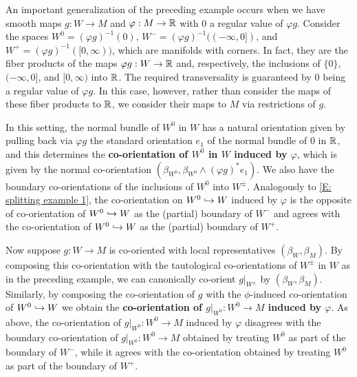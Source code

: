 \begin{example}\label{E: manifold decomposition}
An important generalization of the preceding example occurs when we have smooth maps $g:W\to M$ and $\varphi:M\to \mathbb{R}$ with $0$ a regular value of $\varphi g$. Consider the spaces $W^0=(\varphi g)^{-1}(0)$, $W^-=(\varphi g)^{-1}((-\infty,0])$, and $W^+=(\varphi g)^{-1}([0,\infty))$, which are manifolds with corners. In fact, they are the fiber products  of the maps $\varphi g:W\to \mathbb{R}$ and, respectively, the inclusions of $\{0\}$, $(-\infty, 0]$, and $[0,\infty)$ into $\mathbb{R}$. The required transversality is guaranteed by $0$ being a regular value of $\varphi g$. In this case, however, rather than consider the maps of these fiber products to $\mathbb{R}$, we consider their maps to $M$ via restrictions of $g$. 
  
In this setting, the normal bundle of $W^0$ in $W$ has a natural  orientation given by pulling back via $\varphi g$ the standard orientation $e_1$ of the normal bundle of $0$ in $\mathbb{R}$, and this determines the \textbf{co-orientation of $W^0$ in $W$ induced by $\varphi$}, which is  given by the normal co-orientation  $(\beta_{W^0}, \beta_{W^0} \wedge(\varphi g)^*e_1)$. We also have the boundary  co-orientations of the inclusions of $W^0$ into $W^{\pm}$. Analogously to \cref{E: splitting example 1}, the co-orientation on $W^0\hookrightarrow W$ induced by $\varphi$ is the opposite of co-orientation of $W^0\hookrightarrow W$ as the (partial) boundary of $W^-$ and agrees with the co-orientation of $W^0\hookrightarrow W$ as the (partial) boundary of $W^+$. 

Now suppose $g:W\to M$ is co-oriented with local representatives $(\beta_W,\beta_M)$. By composing this co-orientation with the tautological co-orientations of $W^\pm$ in $W$ as in the preceding example, we can canonically co-orient $g|_{W^\pm}$ by $(\beta_W,\beta_M)$. Similarly, by composing the co-orientation of $g$ with the $\phi$-induced co-orientation of $W^0\hookrightarrow W$  we obtain the \textbf{co-orientation of  $g|_{W^0}:W^0\to M$ induced by $\varphi$}.
As above, the co-orientation of $g|_{W^0}:W^0\to M$ induced by $\varphi$ disagrees with  the boundary co-orientation of  $g|_{W^0}:W^0\to M$ obtained by treating $W^0$ as part of the boundary of $W^-$, while it agrees with the co-orientation obtained by treating $W^0$ as part of the boundary of $W^+$. 


\end{example}
